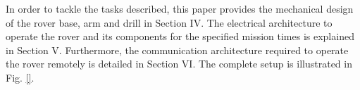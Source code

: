 \documentclass[letterpaper, 10 pt, conference]{ieeeconf}  %
\begin{document}
In order to tackle the tasks described, this paper provides the mechanical design of the rover base, arm and drill in Section IV. The electrical architecture to operate the rover and its components for the specified mission times is explained in Section V. Furthermore, the communication architecture required to operate the rover remotely is detailed in Section VI. The complete setup is illustrated in Fig. \ref{}. 



\label{sec:mech:base}

\newcommand{\rWheel}{\SI{0.120}{\meter}}      %
\newcommand{\wWidth}{\SI{0.070}{\meter}}      %
\newcommand{\Ttrack}{\SI{0.642}{\meter}}      %
\newcommand{\cBogie}{\SI{0.283}{\meter}}      %
\newcommand{\Lspan}{\SI{0.566}{\meter}}       %
\newcommand{\gcbelly}{\SI{0.215}{\meter}}     %
\newcommand{\gcrear}{\SI{0.147}{\meter}}      %
\newcommand{\Orrear}{\SI{0.209}{\meter}}      %
\newcommand{\hCOM}{\SI{0.282}{\meter}}        %
\newcommand{\Wfull}{\SI{706.3}{\newton}}      %
\newcommand{\Lcross}{\SI{0.525}{\meter}}      %
\newcommand{\ltie}{\SI{0.272}{\meter}}        %
\newcommand{\abell}{\SI{0.045}{\meter}}       %
\newcommand{\Reff}{\SI{0.25}{\meter}}         %
\newcommand{\drod}{\SI{19}{\milli\meter}}     %
\newcommand{\Etie}{\SI{70}{\giga\pascal}}     %
\newcommand{\sigyHoneone}{\SI{80}{\mega\pascal}}  %
\newcommand{\sigyHtwoTwo}{\SI{160}{\mega\pascal}} %
\newcommand{\Sy}{2.5}                         %
\newcommand{\gammabuck}{2.0}                  %
\newcommand{\tauWheel}{\SI{5}{\newton\meter}} %
\newcommand{\rpmMax}{\SI{110}{\minute^{-1}}}   %

\end{document}
